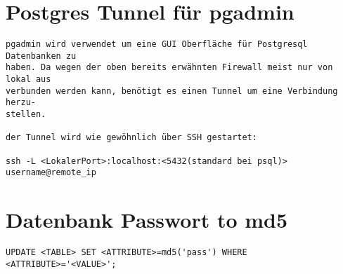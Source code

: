 \documentclass[a4paper,10pt]{report}
\begin{document}
\section{Postgres Tunnel für pgadmin}
\begin{verbatim}
pgadmin wird verwendet um eine GUI Oberfläche für Postgresql Datenbanken zu 
haben. Da wegen der oben bereits erwähnten Firewall meist nur von lokal aus 
verbunden werden kann, benötigt es einen Tunnel um eine Verbindung herzu-
stellen.

der Tunnel wird wie gewöhnlich über SSH gestartet:

ssh -L <LokalerPort>:localhost:<5432(standard bei psql)> username@remote_ip 
\end{verbatim}

\section{Datenbank Passwort to md5}
\begin{verbatim}
UPDATE <TABLE> SET <ATTRIBUTE>=md5('pass') WHERE <ATTRIBUTE>='<VALUE>';
\end{verbatim}
\end{document}
